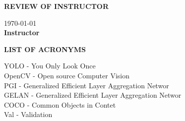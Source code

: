 \documentclass[a4paper,13pt]{report}
\begin{document}
    \newpage
    \centerline{\huge{\textbf{REVIEW OF INSTRUCTOR}}}
    \vspace{10mm}
    \noindent\makebox[\linewidth]{\rule{\paperwidth}{0.4pt}}
    \noindent\makebox[\linewidth]{\rule{\paperwidth}{0.4pt}}
    \noindent\makebox[\linewidth]{\rule{\paperwidth}{0.4pt}}
    \noindent\makebox[\linewidth]{\rule{\paperwidth}{0.4pt}}
    \noindent\makebox[\linewidth]{\rule{\paperwidth}{0.4pt}}
    \noindent\makebox[\linewidth]{\rule{\paperwidth}{0.4pt}}
    \noindent\makebox[\linewidth]{\rule{\paperwidth}{0.4pt}}
    \noindent\makebox[\linewidth]{\rule{\paperwidth}{0.4pt}}
    \noindent\makebox[\linewidth]{\rule{\paperwidth}{0.4pt}}
    \noindent\makebox[\linewidth]{\rule{\paperwidth}{0.4pt}}
    \noindent\makebox[\linewidth]{\rule{\paperwidth}{0.4pt}}
    \noindent\makebox[\linewidth]{\rule{\paperwidth}{0.4pt}}
    \noindent\makebox[\linewidth]{\rule{\paperwidth}{0.4pt}}
    \noindent\makebox[\linewidth]{\rule{\paperwidth}{0.4pt}}
    \noindent\makebox[\linewidth]{\rule{\paperwidth}{0.4pt}}
    \vspace{10mm}
    \begin{flushright}
        \today \\ 
        \vspace{5mm}
        \textbf{Instructor}
    \end{flushright}

    \newpage
    \tableofcontents
    \listoffigures

    \newpage
    \thispagestyle{plain}
    \justifying
    \centerline{\textbf{\huge{LIST OF ACRONYMS}}}
    \begin{flushleft}
        YOLO - You Only Look Once \\
        \vspace{3mm}
        OpenCV - Open source Computer Vision \\ 
        \vspace{3mm}
        PGI - Generalized Efficient Layer Aggregation Networ \\ 
        \vspace{3mm}
        GELAN - Generalized Efficient Layer Aggregation Networ \\
        \vspace{3mm}
        COCO - Common Objects in Contet \\
        \vspace{3mm}
        Val - Validation
    \end{flushleft}

    
\end{document}
